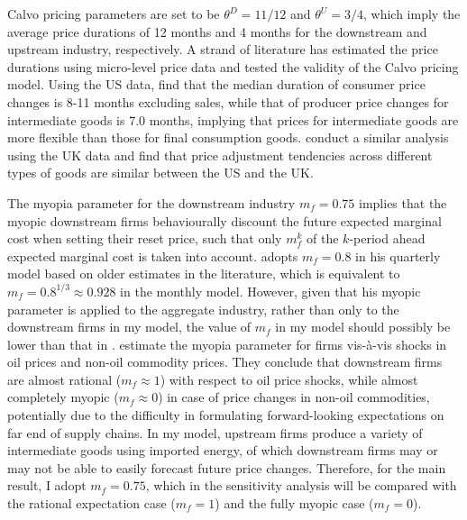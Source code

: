 \documentclass[a4paper, 12pt]{article}
\theoremstyle{definition*}
\begin{document}
Calvo pricing parameters are set to be $\theta^D = 11/12$ and $\theta^U = 3/4$, which imply the average price durations of 12 months and 4 months for the downstream and upstream industry, respectively.
A strand of literature has estimated the price durations using micro-level price data and tested the validity of the Calvo pricing model.
Using the US data, \cite{nakamura2008five} find that the median duration of consumer price changes is 8-11 months excluding sales, while that of producer price changes for intermediate goods is 7.0 months, implying that prices for intermediate goods are more flexible than those for final consumption goods.
\cite{bunn2012how} conduct a similar analysis using the UK data and find that price adjustment tendencies across different types of goods are similar between the US and the UK.


The myopia parameter for the downstream industry $m_f = 0.75$ implies that the myopic downstream firms behaviourally discount the future expected marginal cost when setting their reset price, such that only $m_f^k$ of the $k$-period ahead expected marginal cost is taken into account.
\cite{gabaix2020behavioral} adopts $m_f = 0.8$ in his quarterly model based on older estimates in the literature, which is equivalent to $m_f = 0.8^{1/3} \approx 0.928$ in the monthly model.
However, given that his myopic parameter is applied to the aggregate industry, rather than only to the downstream firms in my model, the value of $m_f$ in my model should possibly be lower than that in \cite{gabaix2020behavioral}.
\cite{minton2023delayed} estimate the myopia parameter for firms vis-\`a-vis shocks in oil prices and non-oil commodity prices.
They conclude that downstream firms are almost rational ($m_f \approx 1$) with respect to oil price shocks, while almost completely myopic ($m_f \approx 0$) in case of price changes in non-oil commodities, potentially due to the difficulty in formulating forward-looking expectations on far end of supply chains.
In my model, upstream firms produce a variety of intermediate goods using imported energy, of which downstream firms may or may not be able to easily forecast future price changes.
Therefore, for the main result, I adopt $m_f = 0.75$, which in the sensitivity analysis will be compared with the rational expectation case ($m_f = 1$) and the fully myopic case ($m_f = 0$).
\end{document}
